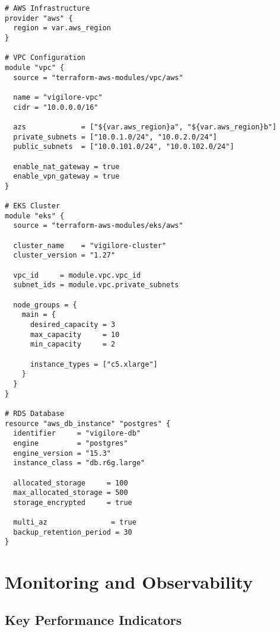\documentclass[12pt,a4paper]{report}
\begin{document}
\begin{lstlisting}[language=HCL, caption=Terraform Configuration Example]
# AWS Infrastructure
provider "aws" {
  region = var.aws_region
}

# VPC Configuration
module "vpc" {
  source = "terraform-aws-modules/vpc/aws"
  
  name = "vigilore-vpc"
  cidr = "10.0.0.0/16"
  
  azs             = ["${var.aws_region}a", "${var.aws_region}b"]
  private_subnets = ["10.0.1.0/24", "10.0.2.0/24"]
  public_subnets  = ["10.0.101.0/24", "10.0.102.0/24"]
  
  enable_nat_gateway = true
  enable_vpn_gateway = true
}

# EKS Cluster
module "eks" {
  source = "terraform-aws-modules/eks/aws"
  
  cluster_name    = "vigilore-cluster"
  cluster_version = "1.27"
  
  vpc_id     = module.vpc.vpc_id
  subnet_ids = module.vpc.private_subnets
  
  node_groups = {
    main = {
      desired_capacity = 3
      max_capacity     = 10
      min_capacity     = 2
      
      instance_types = ["c5.xlarge"]
    }
  }
}

# RDS Database
resource "aws_db_instance" "postgres" {
  identifier     = "vigilore-db"
  engine         = "postgres"
  engine_version = "15.3"
  instance_class = "db.r6g.large"
  
  allocated_storage     = 100
  max_allocated_storage = 500
  storage_encrypted     = true
  
  multi_az               = true
  backup_retention_period = 30
}
\end{lstlisting}

\chapter{Monitoring and Observability}

\section{Key Performance Indicators}
\end{document}
